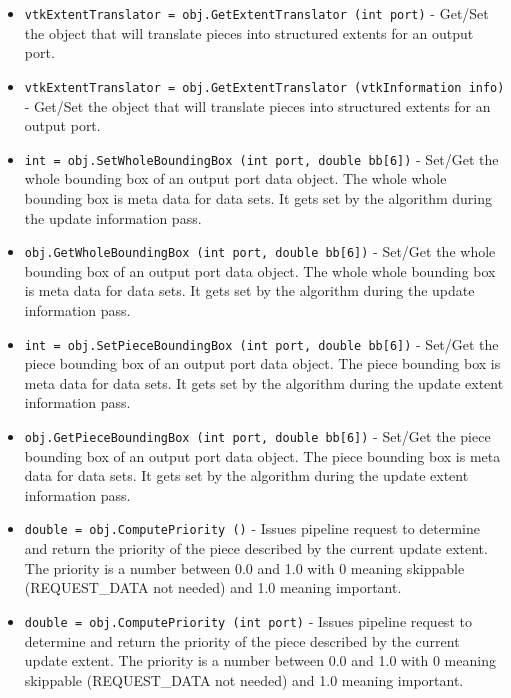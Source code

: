 \begin{itemize}
\item  \verb|vtkExtentTranslator = obj.GetExtentTranslator (int port)| -  Get/Set the object that will translate pieces into structured
 extents for an output port.

\item  \verb|vtkExtentTranslator = obj.GetExtentTranslator (vtkInformation info)| -  Get/Set the object that will translate pieces into structured
 extents for an output port.

\item  \verb|int = obj.SetWholeBoundingBox (int port, double bb[6])| -  Set/Get the whole bounding box of an output port data object.
 The whole whole bounding box is meta data for data sets.  It gets
 set by the algorithm during the update information pass.

\item  \verb|obj.GetWholeBoundingBox (int port, double bb[6])| -  Set/Get the whole bounding box of an output port data object.
 The whole whole bounding box is meta data for data sets.  It gets
 set by the algorithm during the update information pass.

\item  \verb|int = obj.SetPieceBoundingBox (int port, double bb[6])| -  Set/Get the piece bounding box of an output port data object.
 The piece bounding box is meta data for data sets.  It gets
 set by the algorithm during the update extent information pass.

\item  \verb|obj.GetPieceBoundingBox (int port, double bb[6])| -  Set/Get the piece bounding box of an output port data object.
 The piece bounding box is meta data for data sets.  It gets
 set by the algorithm during the update extent information pass.

\item  \verb|double = obj.ComputePriority ()| -  Issues pipeline request to determine and return the priority of the 
 piece described by the current update extent. The priority is a 
 number between 0.0 and 1.0 with 0 meaning skippable (REQUEST\_DATA 
 not needed) and 1.0 meaning important. 

\item  \verb|double = obj.ComputePriority (int port)| -  Issues pipeline request to determine and return the priority of the 
 piece described by the current update extent. The priority is a 
 number between 0.0 and 1.0 with 0 meaning skippable (REQUEST\_DATA 
 not needed) and 1.0 meaning important. 

\end{itemize}
